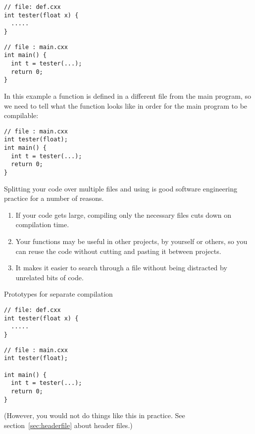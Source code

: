 \begin{multicols}{2}  
\begin{lstlisting}
// file: def.cxx
int tester(float x) {
  .....
}
\end{lstlisting}
\vfill\columnbreak
\begin{lstlisting}
// file : main.cxx
int main() {
  int t = tester(...);
  return 0;
}
\end{lstlisting}
\end{multicols}

In this example a function 
is defined in a different file from the main program, so we need to
tell  what the function looks like in order for the main
program to be compilable:

\begin{lstlisting}
// file : main.cxx
int tester(float);
int main() {
  int t = tester(...);
  return 0;
}
\end{lstlisting}

Splitting your code over multiple
files and using
is good software engineering practice for a number of
reasons. 
\begin{enumerate}
\item If your code gets large, compiling only the necessary files cuts
  down on compilation time.
\item Your functions may be useful in other projects, by yourself or
  others, so you can reuse the code without cutting and pasting it
  between projects.
\item It makes it easier to search through a file without being
  distracted by unrelated bits of code.
\end{enumerate}

\begin{slide}{Prototypes for separate compilation}
\label{sl:separate-proto}
\begin{multicols}{2}  
\begin{lstlisting}
// file: def.cxx
int tester(float x) {
  .....
}
\end{lstlisting}
\vfill\columnbreak
\begin{lstlisting}
// file : main.cxx
int tester(float);

int main() {
  int t = tester(...);
  return 0;
}
\end{lstlisting}
\end{multicols}
\end{slide}

(However, you would not do things like this in practice. See 
section~\ref{sec:headerfile} about header files.)

